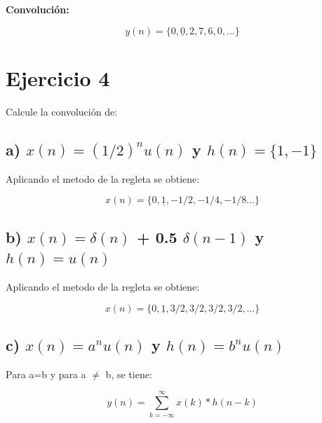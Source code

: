 \documentclass[12pt,a4paper]{article}
\begin{document}
\textbf{Convolución:}

\begin{equation}
\boxed{y(n) = \{0, \underline{0}, 2, 7, 6, 0, \ldots\}}
\end{equation}

\section*{Ejercicio 4}

Calcule la convolución de:
\vspace{0.4cm}

\subsection*{a) $x(n) = (1/2)^n u(n)$ y $h(n) = \{1, -1\}$}
\vspace{0.4cm}

Aplicando el metodo de la regleta se obtiene:
\vspace{0.4cm}

\begin{equation}
\boxed{x(n) = \{0, \underline{1}, -1/2, -1/4, -1/8 \ldots\}}
\end{equation}
\vspace{0.4cm}

\subsection*{b) $x(n) = \delta(n)$ + 0.5 $\delta(n-1)$ y $h(n) = u(n)$}
\vspace{0.4cm}

Aplicando el metodo de la regleta se obtiene:
\vspace{0.4cm}

\begin{equation}
\boxed{x(n) = \{0, \underline{1}, 3/2, 3/2, 3/2, 3/2, \ldots\}}
\end{equation}
\vspace{0.4cm}

\subsection*{c) $x(n) = a^n u(n)$ y $h(n) = b^n u(n)$}
\vspace{0.4cm}

Para a=b y para a $\neq$ b, se tiene:
\vspace{0.4cm}

\begin{equation}
y(n) = \sum_{k=-\infty}^{\infty} x(k) * h(n-k)
\end{equation}
\end{document}
